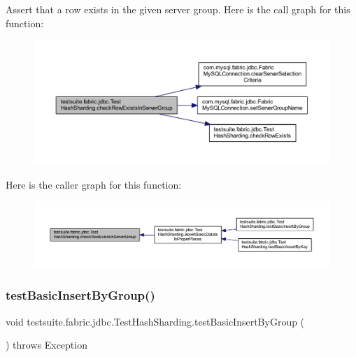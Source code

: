 Assert that a row exists in the given server group. Here is the call graph for this function\+:
\nopagebreak
\begin{figure}[H]
\begin{center}
\leavevmode
\includegraphics[width=350pt]{classtestsuite_1_1fabric_1_1jdbc_1_1_test_hash_sharding_a9d7cbb774663dec35a3f486d09f5d124_cgraph}
\end{center}
\end{figure}
Here is the caller graph for this function\+:
\nopagebreak
\begin{figure}[H]
\begin{center}
\leavevmode
\includegraphics[width=350pt]{classtestsuite_1_1fabric_1_1jdbc_1_1_test_hash_sharding_a9d7cbb774663dec35a3f486d09f5d124_icgraph}
\end{center}
\end{figure}
\mbox{\label{classtestsuite_1_1fabric_1_1jdbc_1_1_test_hash_sharding_a4d63bb47eb2f1bc8fcbc57257a21def1}} 
\subsubsection{\texorpdfstring{test\+Basic\+Insert\+By\+Group()}{testBasicInsertByGroup()}}
{\footnotesize\ttfamily void testsuite.\+fabric.\+jdbc.\+Test\+Hash\+Sharding.\+test\+Basic\+Insert\+By\+Group (\begin{DoxyParamCaption}{ }\end{DoxyParamCaption}) throws Exception}

